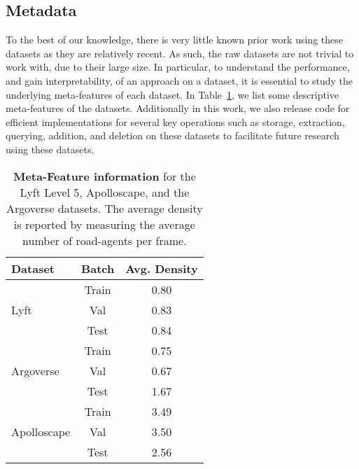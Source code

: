 \documentclass[10pt,twocolumn,letterpaper]{article}
\newcommand\Tstrut{\rule{0pt}{2.6ex}}         \newcommand\Bstrut{\rule[-1.3ex]{0pt}{0pt}}   \newcommand\mathdash{\text{\normalfont --}}
\theoremstyle{plain}
\begin{document}
\subsection{Metadata}
To the best of our knowledge, there is very little known prior work using these datasets as they are relatively recent. As such, the raw datasets are not trivial to work with, due to their large size. In particular, to understand the performance, and gain interpretability, of an approach on a dataset, it is essential to study the underlying meta-features of each dataset. In Table~\ref{tab: meta}, we list some descriptive meta-features of the datasets. Additionally in this work, we also release code for efficient implementations for several key operations such as storage, extraction, querying, addition, and deletion on these datasets to facilitate future research using these datasets.

\begin{table}[h]
\centering
\begin{tabular}{lcc} 
\toprule
Dataset & Batch & Avg. Density  \\
\hline

\multirow{3}{*}{Lyft} & Train & \Tstrut 0.80 \\
           & Val & 0.83 \\
           & Test & 0.84 \\                    
\midrule
\multirow{3}{*}{Argoverse} & Train & \Tstrut  0.75 \\
                           & Val & 0.67 \\
                           & Test & 1.67 \\


\midrule                           
\multirow{3}{*}{Apolloscape} & Train & \Tstrut  3.49 \\
                            & Val & 3.50 \\
                            & Test & 2.56 \\                         
            








\bottomrule
\end{tabular}
\caption{\textbf{Meta-Feature information} for the Lyft Level 5, Apolloscape, and the Argoverse datasets. The average density is reported by measuring the average number of road-agents per frame.}
\label{tab: meta}
\end{table}
\end{document}
